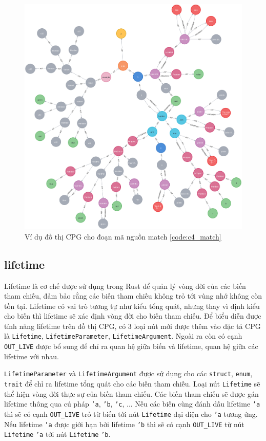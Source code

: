 \begin{figure}[H]
    \includegraphics[width=1\columnwidth]{figures/c4/c4_match.png}
    \centering
    \caption{Ví dụ đồ thị CPG cho đoạn mã nguồn match \ref{code:c4_match}}
    \label{img:c4_match}
\end{figure}

\subsection{lifetime}

Lifetime là cơ chế được sử dụng trong Rust để quản lý vòng đời của các biến tham chiếu, đảm bảo rằng các biến tham chiếu không trỏ tới vùng nhớ không còn tồn tại.
Lifetime có vai trò tương tự như kiểu tổng quát, nhưng thay vì định kiểu cho biến thì lifetime sẽ xác định vòng đời cho biến tham chiếu.
Để biểu diễn được tính năng lifetime trên đồ thị CPG, có 3 loại nút mới được thêm vào đặc tả CPG là \texttt{Lifetime}, \texttt{LifetimeParameter}, \texttt{LifetimeArgument}.
Ngoài ra còn có cạnh \texttt{OUT\_LIVE} được bổ sung để chỉ ra quan hệ giữa biến và lifetime, quan hệ giữa các lifetime với nhau.

\texttt{LifetimeParameter} và \texttt{LifetimeArgument} được sử dụng cho các \texttt{struct}, \texttt{enum}, \texttt{trait} để chỉ ra lifetime tổng quát cho các biến tham chiếu.
Loại nút \texttt{Lifetime} sẽ thể hiện vòng đời thực sự của biến tham chiếu.
Các biến tham chiếu sẽ được gán lifetime thông qua cú pháp \texttt{'a}, \texttt{'b}, \texttt{'c}, ...
Nếu các biến cùng đánh dấu lifetime \texttt{'a} thì sẽ có cạnh \texttt{OUT\_LIVE} trỏ từ biến tới nút \texttt{Lifetime} đại diện cho \texttt{'a} tương ứng.
Nếu lifetime \texttt{'a} được giới hạn bởi lifetime \texttt{'b} thì sẽ có cạnh \texttt{OUT\_LIVE} từ nút \texttt{Lifetime} \texttt{'a} tới nút \texttt{Lifetime} \texttt{'b}.

